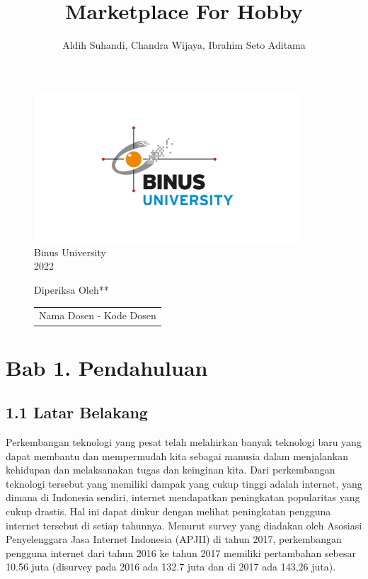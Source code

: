 \documentclass[a4paper]{article}
\begin{document}
\linespread{1.5}

\title{Marketplace For Hobby}
\author{Aldih Suhandi, Chandra Wijaya, Ibrahim Seto Aditama}

\maketitle
\begin{figure}[h]
    \centering
    \includegraphics[width=10cm]{logo_binus.png}\\
    Binus University\\
    2022
\end{figure}
\begin{figure}[h]
    \centering
    Diperiksa Oleh**\\
    \vspace{15mm}
    \begin{tabular}{@{}p{2.5in}@{}}
    \centering
    Nama Dosen - Kode Dosen
    \end{tabular}
\end{figure}

\newpage
{}
\tableofcontents

\newpage
\section*{Bab 1. Pendahuluan}

\subsection*{1.1 Latar Belakang}

Perkembangan teknologi yang pesat telah melahirkan banyak teknologi baru yang dapat membantu dan mempermudah kita sebagai manusia dalam menjalankan kehidupan dan melaksanakan tugas dan keinginan kita. Dari perkembangan teknologi tersebut yang memiliki dampak yang cukup tinggi adalah internet, yang dimana di Indonesia sendiri, internet mendapatkan peningkatan popularitas yang cukup drastis. Hal ini dapat diukur dengan melihat peningkatan pengguna internet tersebut di setiap tahunnya. Menurut survey yang diadakan oleh Asosiasi Penyelenggara Jasa Internet Indonesia (APJII) di tahun 2017, perkembangan pengguna internet dari tahun 2016 ke tahun 2017 memiliki pertambahan sebesar 10.56 juta (disurvey pada 2016 ada 132.7 juta dan di 2017 ada 143,26 juta)\autocite{indonesia2017infografis}.
\end{document}
